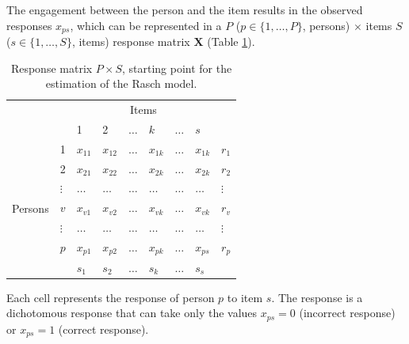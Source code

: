 \documentclass[12pt]{book}
\begin{document}
The engagement between the person and the item results in the observed responses $x_{ps}$, which can be represented in a $P$ ($p \in \{1, \ldots, P\}$, persons) $\times$ items $S$ ($s\in \{1, \ldots, S\}$, items) response matrix $\bm{X}$ (Table \ref{tab:rasch}). 

\begin{table}[h!]
	\centering
	\caption{\label{tab:rasch} Response matrix $P \times S$, starting point for the estimation of the Rasch model.}
	\begin{tabular}{p{1cm}  p{1cm}  |p{1.5cm}  p{1.5cm} p{1.5cm} p{1.5cm} p{1.5cm} p{1.5cm} | p{1.5cm}}
		& \multicolumn{1}{l}{} & \multicolumn{6}{c}{Items} & \multicolumn{1}{c}{} \\
		& \multicolumn{1}{c}{} & \multicolumn{1}{l}{1} & \multicolumn{1}{l}{2} & \multicolumn{1}{l}{$\ldots$} & 
		\multicolumn{1}{l}{$k$} & \multicolumn{1}{l}{$\ldots$} & \multicolumn{1}{l}{$s$}& \\
		\cline{3-8}
		\multirow{8}{*}{Persons} & 1 & $x_{11}$ & $x_{12}$ & $\ldots$& $x_{1k}$ & $\ldots$ & $x_{1k}$ & $r_1$ \\
		&	2 & $x_{21}$ & $x_{22}$ & $\ldots$& $x_{2k}$ & $\ldots$ & $x_{2k}$ & $r_2$ \\
		&	$\vdots$ & $\ldots$ & $\ldots$ & $\ldots$ & $\ldots$ & $\ldots$ & $\ldots$ & $\vdots$ \\
		&	$v$ & $x_{v1}$ & $x_{v2}$ & $\ldots$& $x_{vk}$ & $\ldots$ & $x_{vk}$ & $r_v$ \\
		&	$\vdots$ & $\ldots$ & $\ldots$ & $\ldots$ & $\ldots$ & $\ldots$ & $\ldots$ & $\vdots$ \\
		&	$p$ & $x_{p1}$ & $x_{p2}$ & $\ldots$& $x_{pk}$ & $\ldots$ & $x_{ps}$ & $r_p$ \\
		\cline{3-8}
		& \multicolumn{1}{c}{} & $s_1$ &  $s_2$ & $\ldots$ & $s_k$ & $\ldots$  & \multicolumn{2}{l}{$s_s$}\\ 
	\end{tabular}
\end{table}

Each cell represents the response of person $p$ to item $s$. 
The response is a dichotomous response that can take only the values $x_{ps} = 0$ (incorrect response) or $x_{ps} = 1$ (correct response). 
\end{document}
